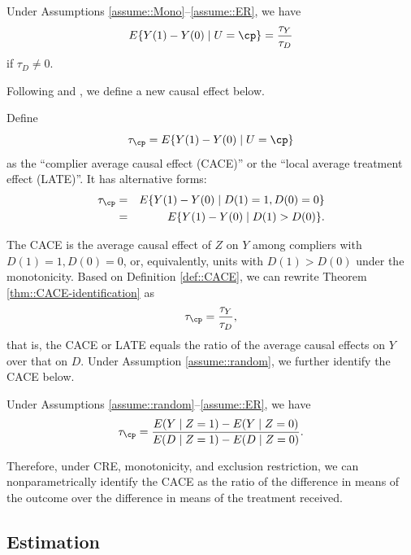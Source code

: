 \begin{theorem}
\label{thm::CACE-identification}
Under Assumptions \ref{assume::Mono}--\ref{assume::ER}, we have 
$$
E\{ Y(1) - Y(0) \mid U=\cp   \} = \frac{ \tau_Y  }{ \tau_D}
$$
if $\tau_D \neq 0$. 
\end{theorem}


 

Following \citet{imbens1994identification} and \citet{angrist1996identification}, we define a new causal effect below.

\begin{definition}\label{def::CACE}
Define 
$$
\tau_\cp  =  E\{ Y(1) - Y(0) \mid U=\cp   \}  
$$
as the ``complier average causal effect (CACE)'' or the ``local average treatment effect (LATE)''. It has alternative forms:
\begin{eqnarray*}
\tau_\cp  &=&  E\{ Y(1) - Y(0) \mid D(1) = 1 , D(0) = 0  \} \\
&=&    E\{ Y(1) - Y(0) \mid D(1)  >  D(0)    \} . 
\end{eqnarray*}
\end{definition}

The CACE is the average causal effect of $Z$ on $Y$ among compliers with $ D(1) = 1 , D(0) = 0$, or, equivalently, units with $ D(1)  >  D(0)$ under the monotonicity.
Based on Definition \ref{def::CACE}, we can rewrite Theorem \ref{thm::CACE-identification} as
$$
\tau_\cp  = \frac{ \tau_Y  }{ \tau_D} ,
$$
that is, the CACE or LATE equals the ratio of the average causal effects on $Y$ over that on $D$. Under Assumption \ref{assume::random}, we further identify the CACE below.


\begin{corollary}
\label{corollary::identification-CACE}
Under Assumptions \ref{assume::random}--\ref{assume::ER}, we have 
$$
\tau_\cp = \frac{ E(Y\mid Z=1) - E(Y\mid Z=0) }{ E(D\mid Z=1) - E(D \mid Z=0) } .
$$
\end{corollary}


Therefore, under CRE, monotonicity, and exclusion restriction, we can nonparametrically identify the CACE as the ratio of the difference in means of the outcome over the difference in means of the treatment received. 



\subsection{Estimation}
\label{sec::estimation-IV}


